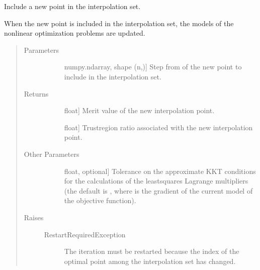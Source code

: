 \documentclass[letterpaper,10pt,english]{sphinxmanual}
\begin{document}
\begin{fulllineitems}
\begin{fulllineitems}
\label{\detokenize{refs/generated/cobyqa.optimize.TrustRegion.update:cobyqa.optimize.TrustRegion.update}}
\sphinxAtStartPar
Include a new point in the interpolation set.

\sphinxAtStartPar
When the new point is included in the interpolation set, the models of
the nonlinear optimization problems are updated.
\begin{quote}\begin{description}
\item[{Parameters}] \leavevmode\begin{description}
\item[{}] \leavevmode{[}numpy.ndarray, shape (n,){]}
\sphinxAtStartPar
Step from  of the new point to include in the interpolation
set.

\end{description}

\item[{Returns}] \leavevmode\begin{description}
\item[{}] \leavevmode{[}float{]}
\sphinxAtStartPar
Merit value of the new interpolation point.

\item[{}] \leavevmode{[}float{]}
\sphinxAtStartPar
Trust\sphinxhyphen{}region ratio associated with the new interpolation point.

\end{description}

\item[{Other Parameters}] \leavevmode\begin{description}
\item[{}] \leavevmode{[}float, optional{]}
\sphinxAtStartPar
Tolerance on the approximate KKT conditions for the calculations of
the least\sphinxhyphen{}squares Lagrange multipliers (the default is
, where  is the
gradient of the current model of the objective function).

\end{description}

\item[{Raises}] \leavevmode\begin{description}
\item[{RestartRequiredException}] \leavevmode
\sphinxAtStartPar
The iteration must be restarted because the index of the optimal
point among the interpolation set has changed.


\end{description}
\end{description}
\end{quote}
\end{fulllineitems}
\end{fulllineitems}
\end{document}
